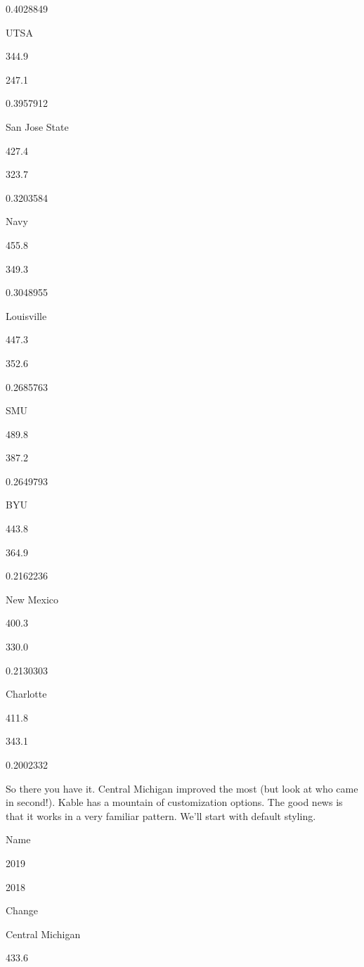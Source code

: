 \documentclass[
]{book}
\newenvironment{Shaded}{\begin{snugshade}}{\end{snugshade}}
\newcommand{\KeywordTok}[1]{\textcolor[rgb]{0.13,0.29,0.53}{\textbf{#1}}}
\newcommand{\NormalTok}[1]{#1}
\newcommand{\OperatorTok}[1]{\textcolor[rgb]{0.81,0.36,0.00}{\textbf{#1}}}
\newcommand{\StringTok}[1]{\textcolor[rgb]{0.31,0.60,0.02}{#1}}
\begin{document}
0.4028849

UTSA

344.9

247.1

0.3957912

San Jose State

427.4

323.7

0.3203584

Navy

455.8

349.3

0.3048955

Louisville

447.3

352.6

0.2685763

SMU

489.8

387.2

0.2649793

BYU

443.8

364.9

0.2162236

New Mexico

400.3

330.0

0.2130303

Charlotte

411.8

343.1

0.2002332

So there you have it. Central Michigan improved the most (but look at who came in second!). Kable has a mountain of customization options. The good news is that it works in a very familiar pattern. We'll start with default styling.

\begin{Shaded}
\end{Shaded}

Name

2019

2018

Change

Central Michigan

433.6
\end{document}
